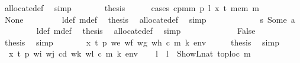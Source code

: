 \begin{isabellebody}
\ allocate{\isacharunderscore}{\kern0pt}def\ \isamarkupfalse%
\ simp\isanewline
\ \ \ \ \isamarkupfalse%
\ \isamarkupfalse%
\ {\isacharquery}{\kern0pt}thesis\isanewline
\ \ \ \ \isamarkupfalse%
\ {\isacharparenleft}{\kern0pt}cases\ {\isachardoublequoteopen}cpm{}m\ p\ l\ x\ t\ mem\ m{\isacharprime}{\kern0pt}{\isachardoublequoteclose}{\isacharparenright}{\kern0pt}\isanewline
\ \ \ \ \ \ \isamarkupfalse%
\ None\isanewline
\ \ \ \ \ \ \isamarkupfalse%
\ {}{}\ l{\isacharunderscore}{\kern0pt}def\ m{\isacharprime}{\kern0pt}{\isacharunderscore}{\kern0pt}def\ \isamarkupfalse%
\ {\isacharquery}{\kern0pt}thesis\ \isamarkupfalse%
\ allocate{\isacharunderscore}{\kern0pt}def\ \isamarkupfalse%
\ simp\isanewline
\ \ \ \ \isamarkupfalse%
\isanewline
\ \ \ \ \ \ \isamarkupfalse%
\ s{}{\isacharcolon}{\kern0pt}\ {\isacharparenleft}{\kern0pt}Some\ a{\isacharparenright}{\kern0pt}\isanewline
\ \ \ \ \ \ \isamarkupfalse%
\ {}{}\ l{\isacharunderscore}{\kern0pt}def\ m{\isacharprime}{\kern0pt}{\isacharunderscore}{\kern0pt}def\ \isamarkupfalse%
\ {\isacharquery}{\kern0pt}thesis\ \isamarkupfalse%
\ allocate{\isacharunderscore}{\kern0pt}def\ \isamarkupfalse%
\ simp\isanewline
\ \ \ \ \isamarkupfalse%
\isanewline
\ \ \isamarkupfalse%
\isanewline
\ \ \ \ \isamarkupfalse%
\ False\isanewline
\ \ \ \ \isamarkupfalse%
\ {}{}\ \isamarkupfalse%
\ {\isacharquery}{\kern0pt}thesis\ \isamarkupfalse%
\ simp\isanewline
\ \ \isamarkupfalse%
\isanewline
{}\isamarkupfalse%
\isanewline
\ \ \isamarkupfalse%
\ {\isacharparenleft}{\kern0pt}{}{}\ x\ t\ p\ we\ wf\ wg\ wh\ c\ m\ k\ env{\isacharparenright}{\kern0pt}\isanewline
\ \ \isamarkupfalse%
\ \isamarkupfalse%
\ {\isacharquery}{\kern0pt}thesis\ \isamarkupfalse%
\ simp\isanewline
{}\isamarkupfalse%
\isanewline
\ \ \isamarkupfalse%
\ {\isacharparenleft}{\kern0pt}{}{}\ x\ t\ p\ wi\ wj\ cd\ wk\ wl\ c\ m\ k\ env{\isacharparenright}{\kern0pt}\isanewline
\ \ \isamarkupfalse%
\ l\ \ {\isachardoublequoteopen}l\ {\isacharequal}{\kern0pt}\ ShowL\isactrlsub n\isactrlsub a\isactrlsub t\ {\isacharparenleft}{\kern0pt}toploc\ m{\isacharparenright}{\kern0pt}{\isachardoublequoteclose}\isanewline

\end{isabellebody}
